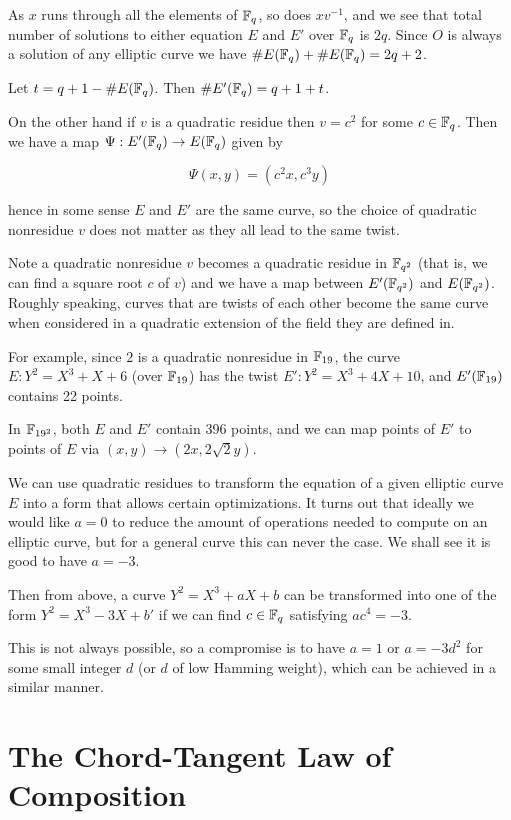 As $x$ runs through all the elements of $\mathbb{F}_q$, so does $xv^{-1}$,
and we see that total number of solutions to either equation $E$ and $E'$
over $\mathbb{F}_q$ is $2q$.
Since $O$ is always a solution of any elliptic curve we have
$\#E(\mathbb{F}_q) + \#E(\mathbb{F}_q) = 2q + 2$.

Let $t = q + 1 - \#E(\mathbb{F}_q)$. Then $\#E'(\mathbb{F}_q) = q + 1 + t$.

On the other hand if $v$ is a quadratic residue then $v = c^2$ for some
$c \in \mathbb{F}_q$. Then we have a map $\Psi : E'(\mathbb{F}_q) \rightarrow E(\mathbb{F}_q)$
given by

\[ \Psi(x,y) = (c^2 x,c^3 y) \]

hence in some sense $E$ and $E'$ are the same curve, so the choice of
quadratic nonresidue $v$ does not matter as they all lead to the same twist.

Note a quadratic
nonresidue $v$ becomes a quadratic residue in $\mathbb{F}_{q^2}$ (that is, we
can find a square root $c$ of $v$)
and we have a map between
$E'(\mathbb{F}_{q^2})$ and $E(\mathbb{F}_{q^2})$. Roughly speaking, curves that are twists
of each other become the same curve when considered in a quadratic extension
of the field they are defined in.

For example, since $2$ is a quadratic nonresidue in $\mathbb{F}_{19}$,
the curve $E : Y^2 = X^3 + X + 6$ (over $\mathbb{F}_{19}$) has the
twist $E': Y^2 = X^3 + 4 X + 10$, and $E'(\mathbb{F}_{19})$ contains 22 points.

In $\mathbb{F}_{19^2}$, both $E$ and $E'$ contain 396 points, and we can map
points of $E'$ to points of $E$ via $(x,y) \rightarrow (2 x, 2\sqrt{2} y)$.

We can use quadratic residues to transform the equation of a given elliptic
curve $E$ into a form that allows certain optimizations.
It turns out that ideally we would like $a = 0$ to reduce the amount of
operations needed to compute on an elliptic curve, but for a general curve
this can never the case. We shall see it is good to have $a = -3$.

Then from above, a curve $Y^2 = X^3 + aX + b$ can be transformed into
one of the form $Y^2 = X^3 - 3X + b'$ if we can find $c\in \mathbb{F}_q$
satisfying $a c^4 = -3$.

This is not always possible, so a compromise is to have
$a = 1$ or $a = -3 d^2$ for some small integer $d$
(or $d$ of low Hamming weight), which can be achieved in a similar manner.

\section {The Chord-Tangent Law of Composition}

